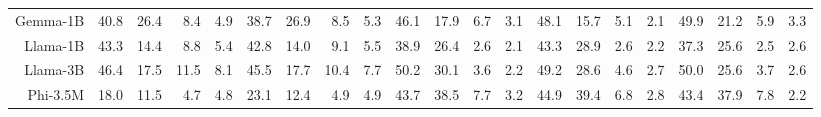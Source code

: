 \begin{table}[t]
{\begin{tabular}{rrrrr|rrrr|rrrr|rrrr|rrrr}
Gemma-1B & \cellcolor[HTML]{EFEFCC}40.8 & \cellcolor[HTML]{FEEBCC}26.4 & \cellcolor[HTML]{F9D3CC}8.4 & \cellcolor[HTML]{F8CFCC}4.9 & \cellcolor[HTML]{F1EFCC}38.7 & \cellcolor[HTML]{FEEDCC}26.9 & \cellcolor[HTML]{FAD4CC}8.5 & \cellcolor[HTML]{F9D0CC}5.3 & \cellcolor[HTML]{D4EACC}46.1 & \cellcolor[HTML]{FDE7CC}17.9 & \cellcolor[HTML]{FAD6CC}6.7 & \cellcolor[HTML]{F9D0CC}3.1 & \cellcolor[HTML]{CEE8CC}48.1 & \cellcolor[HTML]{FCE3CC}15.7 & \cellcolor[HTML]{F9D2CC}5.1 & \cellcolor[HTML]{F8CECC}2.1 & \cellcolor[HTML]{CCE8CC}49.9 & \cellcolor[HTML]{FEECCC}21.2 & \cellcolor[HTML]{FAD4CC}5.9 & \cellcolor[HTML]{F9D0CC}3.3 \\
Llama-1B & \cellcolor[HTML]{EBEECC}43.3 & \cellcolor[HTML]{FBDBCC}14.4 & \cellcolor[HTML]{F9D4CC}8.8 & \cellcolor[HTML]{F9CFCC}5.4 & \cellcolor[HTML]{EAEECC}42.8 & \cellcolor[HTML]{FBDBCC}14.0 & \cellcolor[HTML]{FAD5CC}9.1 & \cellcolor[HTML]{F9D0CC}5.5 & \cellcolor[HTML]{E3EDCC}38.9 & \cellcolor[HTML]{FDF2CC}26.4 & \cellcolor[HTML]{F9CFCC}2.6 & \cellcolor[HTML]{F9CFCC}2.1 & \cellcolor[HTML]{D8EACC}43.3 & \cellcolor[HTML]{F7F0CC}28.9 & \cellcolor[HTML]{F8CECC}2.6 & \cellcolor[HTML]{F8CECC}2.2 & \cellcolor[HTML]{E6EDCC}37.3 & \cellcolor[HTML]{FEF2CC}25.6 & \cellcolor[HTML]{F9CFCC}2.5 & \cellcolor[HTML]{F9CFCC}2.6 \\
Llama-3B & \cellcolor[HTML]{E6EDCC}46.4 & \cellcolor[HTML]{FCDFCC}17.5 & \cellcolor[HTML]{FAD7CC}11.5 & \cellcolor[HTML]{F9D3CC}8.1 & \cellcolor[HTML]{E5EDCC}45.5 & \cellcolor[HTML]{FCE0CC}17.7 & \cellcolor[HTML]{FAD7CC}10.4 & \cellcolor[HTML]{F9D3CC}7.7 & \cellcolor[HTML]{CCE8CC}50.2 & \cellcolor[HTML]{F5F0CC}30.1 & \cellcolor[HTML]{F9D1CC}3.6 & \cellcolor[HTML]{F9CFCC}2.2 & \cellcolor[HTML]{CCE8CC}49.2 & \cellcolor[HTML]{F8F1CC}28.6 & \cellcolor[HTML]{F9D2CC}4.6 & \cellcolor[HTML]{F8CFCC}2.7 & \cellcolor[HTML]{CCE8CC}50.0 & \cellcolor[HTML]{FEF2CC}25.6 & \cellcolor[HTML]{F9D1CC}3.7 & \cellcolor[HTML]{F9CFCC}2.6 \\
Phi-3.5M & \cellcolor[HTML]{FCE0CC}18.0 & \cellcolor[HTML]{FAD7CC}11.5 & \cellcolor[HTML]{F8CECC}4.7 & \cellcolor[HTML]{F8CFCC}4.8 & \cellcolor[HTML]{FDE8CC}23.1 & \cellcolor[HTML]{FAD9CC}12.4 & \cellcolor[HTML]{F9CFCC}4.9 & \cellcolor[HTML]{F9CFCC}4.9 & \cellcolor[HTML]{D9EBCC}43.7 & \cellcolor[HTML]{E4EDCC}38.5 & \cellcolor[HTML]{FAD7CC}7.7 & \cellcolor[HTML]{F9D0CC}3.2 & \cellcolor[HTML]{D5EACC}44.9 & \cellcolor[HTML]{E1ECCC}39.4 & \cellcolor[HTML]{FAD5CC}6.8 & \cellcolor[HTML]{F8CFCC}2.8 & \cellcolor[HTML]{DAEBCC}43.4 & \cellcolor[HTML]{E5EDCC}37.9 & \cellcolor[HTML]{FAD7CC}7.8 & \cellcolor[HTML]{F8CFCC}2.2 \\

\end{tabular}}
\end{table}
